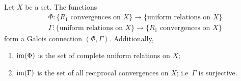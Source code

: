 \begin{proposition} \label{uniformConvergenceGaloisConnection}
Let $X$ be a set. The functions
\begin{align*}
&\Phi: \{\text{$R_1$ convergences on $X$}\} \to \{\text{uniform relations on $X$}\} \\
&\Gamma: \{\text{uniform relations on $X$}\} \to \{\text{$R_1$ convergences on $X$}\}
\end{align*}
form a Galois connection $(\Phi, \Gamma)$. Additionally,
\begin{enumerate}
\item $\operatorname{im}(\Phi)$ is the set of complete uniform relations on $X$;
\item $\operatorname{im}(\Gamma)$ is the set of all reciprocal convergences on $X$; i.e\ $\Gamma$ is surjective.
\end{enumerate}
\end{proposition}
